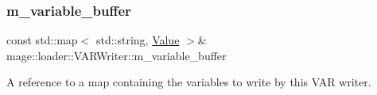 \subsubsection{\texorpdfstring{m\+\_\+variable\+\_\+buffer}{m\_variable\_buffer}}
{\footnotesize\ttfamily const std\+::map$<$ std\+::string, \mbox{\hyperlink{namespacemage_a68ae02d3a746ed2f285aa2b10f131a21}{Value}} $>$\& mage\+::loader\+::\+V\+A\+R\+Writer\+::m\+\_\+variable\+\_\+buffer\hspace{0.3cm}{\ttfamily [private]}}

A reference to a map containing the variables to write by this V\+AR writer. 